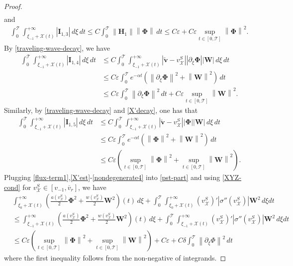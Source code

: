 \documentclass[10pt,a4paper]{amsart}
\def\T{\mathcal{T}}
\def\X{\mathcal{X}}
\def\avr{\overline{v}_r}
\def\ph{\mathbf{\Phi}}
\def\p{\partial}
\def\supt{\mathop{sup}\limits_{t \in [0,\mathcal{T}]}}
\def\vsx{v^S_{\mathcal{X}}}
\def\w{\mathbf{W}}
\newcommand{\norm}[1]{\left\lVert #1 \right\rVert}
\begin{document}
\begin{proof}
\begin{equation}
\begin{aligned}
		\end{aligned}
	\end{equation}
	and
	\begin{equation}\label{nondegenerate2}
		\begin{aligned}
			\int_{0}^{\T} \int_{\xi_{-1}+\X(t)}^{+\infty}|\mathbf{I}_{1,3}|\,d\xi\,dt\leq C\int_{0}^{\T}\norm{\mathbf{H}_1}\norm{\ph}  \,dt\leq C\varepsilon+C\varepsilon \supt\norm{\ph}^2.
		\end{aligned}
	\end{equation}
	By \eqref{traveling-wave-decay}, we have
	\begin{equation}\label{nondegenerate3}
		\begin{aligned}
			\int_{0}^{\T} \int_{\xi_{-1}+\X(t)}^{+\infty}|\mathbf{I}_{1,4}|\,d\xi\,dt&\leq C\int_{0}^{\T} \int_{\xi_{-1}+\X(t)}^{+\infty}|\mathbf{\tilde{v}}-\vsx||\p_{\xi}\ph||\w|\,d\xi\,dt\\
			&\leq C\varepsilon\int_{0}^{\T}e^{-\alpha t}(\norm{\p_{\xi}\ph}^2+\norm{\w}^2)  \,dt\\
			&\leq C\varepsilon\int_{0}^{\T} \norm{\p_{\xi}\ph}^2 \,dt+C\varepsilon\supt\norm{\w}^2.
		\end{aligned}
	\end{equation}
	Similarly, by \eqref{traveling-wave-decay} and \eqref{X'decay}, one has that
	\begin{equation}\label{nondegenerate4}
		\begin{aligned}
			\int_{0}^{\T} \int_{\xi_{-1}+\X(t)}^{+\infty}|\mathbf{I}_{1,5}|\,d\xi\,dt&\leq C\int_{0}^{\T} \int_{\xi_{-1}+\X(t)}^{+\infty}|\mathbf{\tilde{v}}-\vsx||\ph||\w|\,d\xi\,dt\\
			&\leq C\varepsilon\int_{0}^{\T} e^{-\alpha t}(\norm{\ph}^2+\norm{\w}^2) \,dt\\
			&\leq C\varepsilon(\supt\norm{\ph}^2+\supt\norm{\w}^2).
		\end{aligned}
	\end{equation}
	Plugging \eqref{flux-term1},\eqref{X'est}-\eqref{nondegenerate4} into \eqref{pst-part} and using \eqref{XYZ-cond} for $\vsx\in[v_{-1},\avr]$, we have
	\begin{equation}\label{pst-integral}
		\begin{aligned}
			&\int_{\xi_{0}+\X(t)}^{+\infty}\left(\frac{a(\vsx)}{2}\ph^2+\frac{w(\vsx)}{2}\w^2\right)(t)\,d\xi+\int_{0}^{\T}\int_{\xi_{0}+\X(t)}^{+\infty}(\vsx)'|\sigma''(\vsx)|\w^2\,d\xi dt\\
			&\leq\int_{\xi_{-1}+\X(t)}^{+\infty}\left(\frac{a(\vsx)}{2}\ph^2+\frac{w(\vsx)}{2}\w^2\right)(t)\,d\xi+\int_{0}^{\T}\int_{\xi_{-1}+\X(t)}^{+\infty}(\vsx)'|\sigma''(\vsx)|\w^2\,d\xi dt\\
			&\leq C\varepsilon(\supt\norm{\ph}^2+\supt\norm{\w}^2)+C\varepsilon+C\delta\int_{0}^{\T}\norm{\p_{\xi}\Phi}^2\,dt
		\end{aligned}
	\end{equation}
	where the first inequality follows from the non-negative of integrands.
	

\end{proof}
\end{document}
